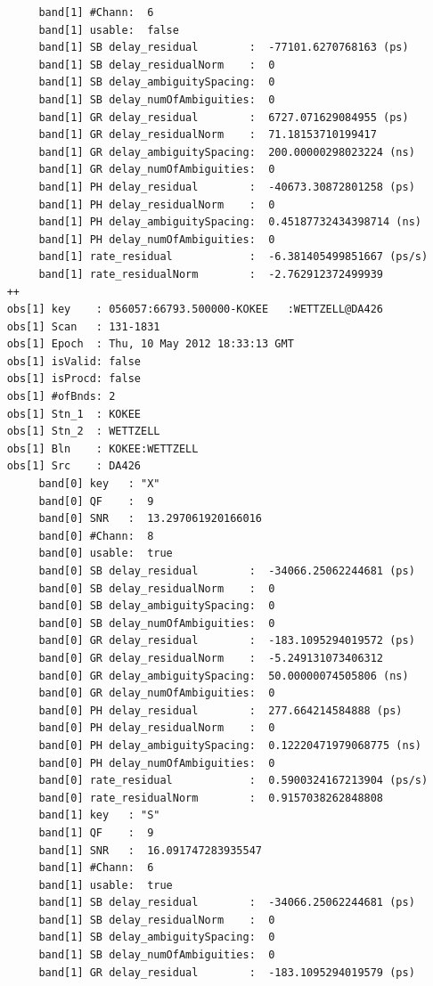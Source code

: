 \documentclass [10pt,letterpaper]{report}
\begin{document}
{{{\begin{verbatim}
         band[1] #Chann:  6
         band[1] usable:  false
         band[1] SB delay_residual        :  -77101.6270768163 (ps)
         band[1] SB delay_residualNorm    :  0
         band[1] SB delay_ambiguitySpacing:  0
         band[1] SB delay_numOfAmbiguities:  0
         band[1] GR delay_residual        :  6727.071629084955 (ps)
         band[1] GR delay_residualNorm    :  71.18153710199417
         band[1] GR delay_ambiguitySpacing:  200.00000298023224 (ns)
         band[1] GR delay_numOfAmbiguities:  0
         band[1] PH delay_residual        :  -40673.30872801258 (ps)
         band[1] PH delay_residualNorm    :  0
         band[1] PH delay_ambiguitySpacing:  0.45187732434398714 (ns)
         band[1] PH delay_numOfAmbiguities:  0
         band[1] rate_residual            :  -6.381405499851667 (ps/s)
         band[1] rate_residualNorm        :  -2.762912372499939
    ++
    obs[1] key    : 056057:66793.500000-KOKEE   :WETTZELL@DA426   
    obs[1] Scan   : 131-1831  
    obs[1] Epoch  : Thu, 10 May 2012 18:33:13 GMT
    obs[1] isValid: false
    obs[1] isProcd: false
    obs[1] #ofBnds: 2
    obs[1] Stn_1  : KOKEE
    obs[1] Stn_2  : WETTZELL
    obs[1] Bln    : KOKEE:WETTZELL
    obs[1] Src    : DA426
         band[0] key   : "X"
         band[0] QF    :  9
         band[0] SNR   :  13.297061920166016
         band[0] #Chann:  8
         band[0] usable:  true
         band[0] SB delay_residual        :  -34066.25062244681 (ps)
         band[0] SB delay_residualNorm    :  0
         band[0] SB delay_ambiguitySpacing:  0
         band[0] SB delay_numOfAmbiguities:  0
         band[0] GR delay_residual        :  -183.1095294019572 (ps)
         band[0] GR delay_residualNorm    :  -5.249131073406312
         band[0] GR delay_ambiguitySpacing:  50.00000074505806 (ns)
         band[0] GR delay_numOfAmbiguities:  0
         band[0] PH delay_residual        :  277.664214584888 (ps)
         band[0] PH delay_residualNorm    :  0
         band[0] PH delay_ambiguitySpacing:  0.12220471979068775 (ns)
         band[0] PH delay_numOfAmbiguities:  0
         band[0] rate_residual            :  0.5900324167213904 (ps/s)
         band[0] rate_residualNorm        :  0.9157038262848808
         band[1] key   : "S"
         band[1] QF    :  9
         band[1] SNR   :  16.091747283935547
         band[1] #Chann:  6
         band[1] usable:  true
         band[1] SB delay_residual        :  -34066.25062244681 (ps)
         band[1] SB delay_residualNorm    :  0
         band[1] SB delay_ambiguitySpacing:  0
         band[1] SB delay_numOfAmbiguities:  0
         band[1] GR delay_residual        :  -183.1095294019579 (ps)

\end{verbatim}}}}
\end{document}
